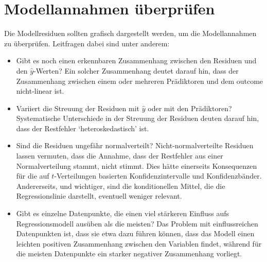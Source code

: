 \documentclass[oneside, 10pt]{book}\usepackage[]{graphicx}\usepackage[]{xcolor}
\begin{document}
\section{Modellannahmen überprüfen}
Die Modellresiduen sollten grafisch dargestellt werden, um
die Modellannahmen zu überprüfen. Leitfragen dabei sind
unter anderem:
\begin{itemize}
	\item Gibt es noch einen erkennbaren Zusammenhang zwischen
	      den Residuen und den $\widehat{y}$-Werten? Ein
	      solcher Zusammenhang deutet darauf hin, dass der
	      Zusammenhang zwischen einem oder mehreren Prädiktoren
	      und dem outcome nicht-linear ist.

	\item Variiert die Streuung der Residuen mit $\widehat{y}$
	      oder mit den Prädiktoren? Systematische Unterschiede
	      in der Streuung der Residuen deuten darauf hin, dass
	      der Restfehler `heteroskedastisch' ist.

	\item Sind die Residuen ungefähr normalverteilt? Nicht-normalverteilte
        Residuen lassen vermuten, dass die Annahme, dass der Restfehler
        aus einer Normalverteilung stammt, nicht stimmt. Dies hätte einerseits
        Konsequenzen für die auf $t$-Verteilungen basierten Konfidenzintervalle
        und Konfidenzbänder. Andererseits, und wichtiger,
        sind die konditionellen Mittel, die
        die Regressionslinie darstellt, eventuell weniger relevant.

	\item Gibt es einzelne Datenpunkte, die einen viel stärkeren
        Einfluss aufs Regressionsmodell ausüben als die meisten?
        Das Problem mit einflussreichen Datenpunkten ist,
        dass sie etwa dazu führen können, dass das Modell
        einen leichten positiven Zusammenhang zwischen den Variablen
        findet, während für die meisten Datenpunkte ein starker
        negativer Zusammenhang vorliegt.
\end{itemize}
\end{document}
